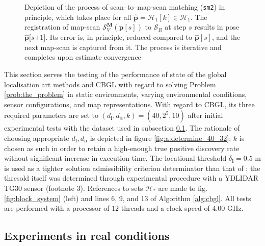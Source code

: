 \begin{figure}\vspace{1cm}
  
  \caption{\small Depiction of the process of scan--to--map-scan matching
           (\texttt{sm2}) in principle, which takes place for all $\hat{\bm{p}}
           = \mathcal{H}_1[k] \in \mathcal{H}_1$. The registration of map-scan
           $\mathcal{S}_V^{\bm{M}}(\hat{\bm{p}}[s])$ to $\mathcal{S}_R$ at step
           $s$ results in pose $\hat{\bm{p}}[s$$+$$1]$. Its error is, in
           principle, reduced compared to $\hat{\bm{p}}[s]$, and the next
           map-scan is captured from it. The process is iterative and completes
           upon estimate convergence}
  \label{fig:sm2_evolution}
\end{figure}

This section serves the testing of the performance of state of the global
localisation art methods and CBGL with regard to solving Problem
\ref{prob:the_problem} in static environments, varying environmental
conditions, sensor configurations, and map representations. With regard to CBGL,
its three required parameters are set to $(d_{\bm{l}},d_{\alpha},k) = (40, 2^5,
10)$ after initial experimental tests with the dataset used in subsection
\ref{subsec:exp_a}. The rationale of choosing appropriate
$d_{\bm{l}},d_{\alpha}$ is depicted in figure \ref{fig:a:determine_40_32};
$k$ is chosen as such in order to retain a high-enough true positive discovery
rate without significant increase in execution time. The locational threshold
$\delta_{\bm{l}} = 0.5$ m is used as a tighter solution admissibility criterion
determinator than that of \cite{Filotheou2022g}; the thresold itself was
determined through experimental procedure with a YDLIDAR TG30 sensor (footnote
3).
References to sets $\mathcal{H}_{\ast}$ are made to fig. \ref{fig:block_system}
(left) and lines
6, 9, and 13 of Algorithm
\ref{alg:cbgl}.
All tests are performed with a processor of $12$
threads and a clock speed of $4.00$ GHz.


\subsection{Experiments in real conditions}
\label{subsec:exp_a}

